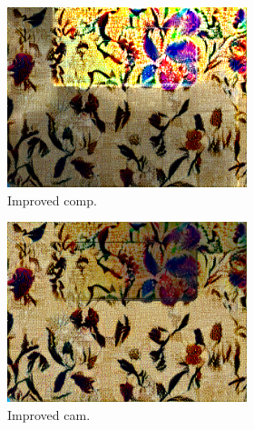 \begin{figure}[]
\begin{subfigure}{\textwidth}
        \begin{subfigure}{0.24\textwidth}
            \centering
            \includegraphics[width=\textwidth]{images/04-experiment02/carpet/flowers2/improved_im.jpg}
            \caption*{Improved comp.}
        \end{subfigure}
        \hfill
        \begin{subfigure}{0.24\textwidth}
            \centering
            \includegraphics[width=\textwidth]{images/04-experiment02/carpet/flowers2/improved_proj.jpg}
            \caption*{Improved cam.}
        \end{subfigure}
        \hfill
        \begin{subfigure}{0.24\textwidth}
            \centering

\end{subfigure}
\end{subfigure}
\end{figure}
